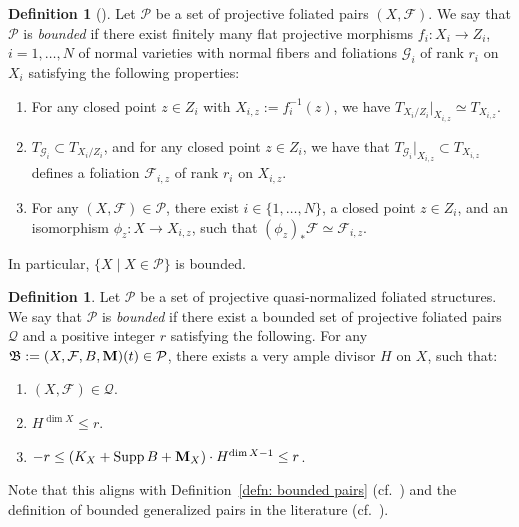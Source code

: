 \documentclass[11pt,reqno]{amsart}
\numberwithin{equation}{section}
\newcommand{\Mm}{{\bf{M}}}
\newcommand{\Supp}{\operatorname{Supp}}
\newcommand{\Bb}{{\mathfrak{B}}}
\newcommand{\Ff}{\mathcal{F}}
\theoremstyle{definition}
\newtheorem{defn}[thm]{Definition}
\begin{document}
\begin{defn}[{\cite[Definition~3.31]{Cas+25a}}]\label{defn: bounded foliated pairs}
Let $\mathcal{P}$ be a set of projective foliated pairs $(X,\Ff)$. We say that $\mathcal{P}$ is \emph{bounded} if there exist finitely many flat projective morphisms 
$f_i\colon X_i\to Z_i$, 
$i=1,\dots,N$ 
of normal varieties with normal fibers and foliations $\mathcal G_i$ of rank $r_i$ on $X_i$ satisfying the following properties:
 \begin{enumerate}
    \item For any closed point $z\in Z_i$
    with $X_{i,z}:=f_i^{-1}(z)$, we have $T_{X_i/Z_i}|_{X_{i,z}}\simeq T_{X_{i,z}}$.
    \item $T_{\mathcal G_i}\subset T_{X_i/Z_i}$, and for any closed point 
    $z\in Z_i$, we have that $T_{\mathcal G_i}|_{X_{i,z}}\subset T_{X_{i,z}}$ defines a foliation ${\Ff_{i,z}}$ of rank $r_i$ on $X_{i,z}$.
    \item For any $(X,\mathcal F)\in \mathcal P$, there exist $i\in\{1,\dots,N\}$, a closed point $z\in Z_i$, and an isomorphism $\phi_z\colon X\to X_{i,z}$, such that $(\phi_z)_\ast\mathcal F\simeq \mathcal F_{i,z}$.
    \end{enumerate}
    In particular, $\{X\mid X\in\mathcal{P}\}$ is bounded.
\end{defn}

\begin{defn}\label{defn: bounded nfs}
Let $\mathcal{P}$ be a set of projective quasi-normalized foliated structures. We say that $\mathcal{P}$ is \emph{bounded} if there exist a bounded set of projective foliated pairs $\mathcal{Q}$ and a positive integer $r$ satisfying the following. For any $\Bb:=(X,\Ff,B,\Mm)(t)\in\mathcal{P}$, there exists a very ample divisor $H$ on $X$, such that:
\begin{enumerate}
    \item $(X,\Ff)\in\mathcal{Q}$.
    \item $H^{\dim X}\leq r$.
    \item $-r\leq (K_X+\Supp B+\Mm_X)\cdot H^{\dim X-1}\leq r$.
\end{enumerate}
Note that this aligns with Definition~\ref{defn: bounded pairs} (cf.~\cite[Lemma~2.20]{Bir19}) and the definition of bounded generalized pairs in the literature (cf.~\cite[Definition~1.1(5)]{Bir21b}).
\end{defn}
\end{document}
